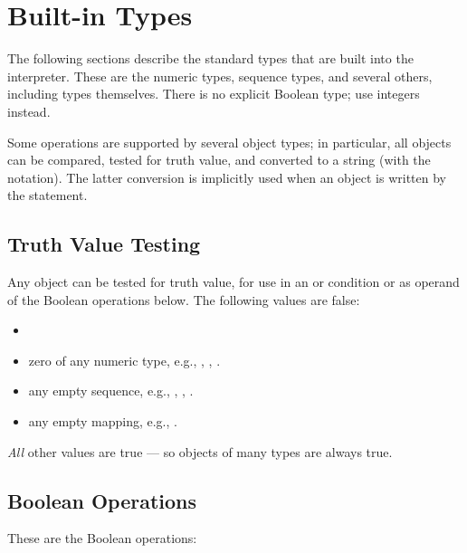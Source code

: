 \section{Built-in Types}

The following sections describe the standard types that are built into
the interpreter.  These are the numeric types, sequence types, and
several others, including types themselves.  There is no explicit
Boolean type; use integers instead.

Some operations are supported by several object types; in particular,
all objects can be compared, tested for truth value, and converted to
a string (with the  notation).  The latter conversion is
implicitly used when an object is written by the  statement.

\subsection{Truth Value Testing}

Any object can be tested for truth value, for use in an  or
 condition or as operand of the Boolean operations below.
The following values are false:

\begin{itemize}
\renewcommand{\indexsubitem}{(Built-in object)}

\item	{}

\item	zero of any numeric type, e.g., , , .

\item	any empty sequence, e.g., , \code{()}, \code{[]}.

\item	any empty mapping, e.g., \code{\{\}}.

\end{itemize}

\emph{All} other values are true --- so objects of many types are
always true.

\subsection{Boolean Operations}

These are the Boolean operations:

